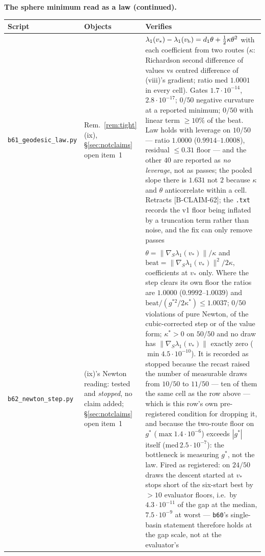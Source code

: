 \documentclass[11pt]{article}
\theoremstyle{remark}
\begin{document}
\noindent\textbf{The sphere minimum read as a law (continued).}
\begin{center}\footnotesize\begin{tabular}{@{}>{\raggedright\arraybackslash}p{5.1cm}%
>{\raggedright\arraybackslash}p{2.5cm}>{\raggedright\arraybackslash}p{5.8cm}@{}}
\toprule Script & Objects & Verifies\\
\midrule
\texttt{b61\_geodesic\_law.py} & Rem.~\ref{rem:tight}(ix), \S\ref{sec:notclaims} open item~1 &
$\lambda_1(v_\ast)-\lambda_1(v_{\rm b})=d_1\theta+\tfrac12\kappa\theta^2$ with each coefficient from two
routes ($\kappa$: Richardson second difference of values vs centred difference of (viii)'s gradient;
ratio med $1.0001$ in every cell). Gates $1.7\cdot10^{-14}$, $2.8\cdot10^{-17}$; $0/50$ negative curvature
at a reported minimum; $0/50$ with linear term $\ge10\%$ of the beat. Law holds with leverage on
$10/50$ --- ratio $1.0000$ ($0.9914$--$1.0008$), residual $\le0.31$ floor --- and the other $40$ are
reported as \emph{no leverage}, not as passes; the pooled slope there is $1.631$ not $2$ because $\kappa$
and $\theta$ anticorrelate within a cell. Retracts [B-CLAIM-62]; the \texttt{.txt} records the v1 floor
being inflated by a truncation term rather than noise, and the fix can only remove passes\\
\texttt{b62\_newton\_step.py} & (ix)'s Newton reading: tested and \emph{stopped}, no claim added;
\S\ref{sec:notclaims} open item~1 &
$\theta=\|\nabla_{\!S}\lambda_1(v_\ast)\|/\kappa$ and $\text{beat}=\|\nabla_{\!S}\lambda_1(v_\ast)\|^2/2
\kappa$, coefficients at $v_\ast$ only. Where the step clears its own floor the ratios are $1.0000$
($0.9992$--$1.0039$) and $\text{beat}/(g^{\ast2}/2\kappa^{\ast})\le1.0037$; $0/50$ violations of pure
Newton, of the cubic-corrected step or of the value form; $\kappa^{\ast}>0$ on $50/50$ and no draw has
$\|\nabla_{\!S}\lambda_1(v_\ast)\|$ exactly zero ($\min4.5\cdot10^{-10}$). It is recorded as stopped
because the recast raised the number of measurable draws from $10/50$ to $11/50$ --- ten of them the
same cell as the row above --- which is this row's own pre-registered condition for dropping it, and
because the two-route floor on $g^{\ast}$ ($\max1.4\cdot10^{-6}$) exceeds $|g^{\ast}|$ itself
($\mathrm{med}\,2.5\cdot10^{-7}$): the bottleneck is measuring $g^{\ast}$, not the law. Fired as
registered: on $24/50$ draws the descent started at $v_\ast$ stops short of the six-start best by
${>}10$ evaluator floors, i.e.\ by $4.3\cdot10^{-11}$ of the gap at the median, $7.5\cdot10^{-9}$ at
worst --- \texttt{b60}'s single-basin statement therefore holds at the gap scale, not at the
evaluator's\\
\bottomrule
\end{tabular}\end{center}
\end{document}
